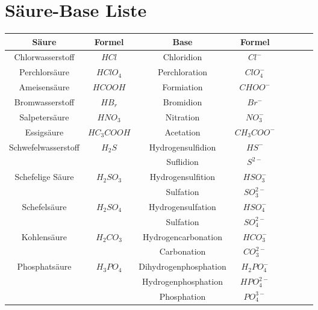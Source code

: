 \section{Säure-Base Liste} \label{sec:säure_base_liste}

\begin{table}[!htbp]
    \centering
    \begin{tabular}{|Sc|Sc|Sc|Sc|}
        \hline
        \textbf{Säure} & \textbf{Formel} & \textbf{Base} & \textbf{Formel} \\
        \hline
        Chlorwasserstoff & $HCl$ & Chloridion & $Cl^-$ \\
        \hline
        Perchlorsäure & $HClO_4$ & Perchloration & $ClO_4^-$ \\
        \hline
        Ameisensäure & $HCOOH$ & Formiation & $CHOO^-$ \\
        \hline 
        Bromwasserstoff & $HB_r$ & Bromidion & $Br^-$ \\
        \hline
        Salpetersäure & $HNO_3$ & Nitration & $NO_3^-$ \\
        \hline
        Essigsäure & $HC_3COOH$ & Acetation & $CH_3COO^-$ \\
        \hline
        \hline
%

        \hline
        Schwefelwasserstoff & $H_2S$ & Hydrogensulfidion & $HS^-$ \\
        \hline
            \ & \ & Suflidion & $S^{2-}$ \\
        \hline
        Schefelige Säure & $H_2SO_3$ & Hydrogensulfition & $HSO_3^-$ \\
        \hline 
            \ & \ & Sulfation & $SO^{2-}_3$ \\
        \hline
        Schefelsäure & $H_2SO_4$ & Hydrogensulfation & $HSO^-_4$ \\
        \hline
            \ & \ & Sulfation & $SO^{2-}_4$ \\
        \hline
        Kohlensäure & $H_2CO_3$ & Hydrogencarbonation & $HCO^-_3$ \\
        \hline
            \ & \ & Carbonation & $CO^{2-}_{3}$ \\
        \hline
        \hline

%


        \hline
        Phosphatsäure & $H_3PO_4$ & Dihydrogenphosphation & $H_2PO^-_4$ \\
        \hline
            \ & \ & Hydrogenphosphation & $HPO_4^{2-}$ \\
        \hline
            \ & \ & Phosphation & $PO^{3-}_4$ \\
        \hline

    \end{tabular}
\end{table}

